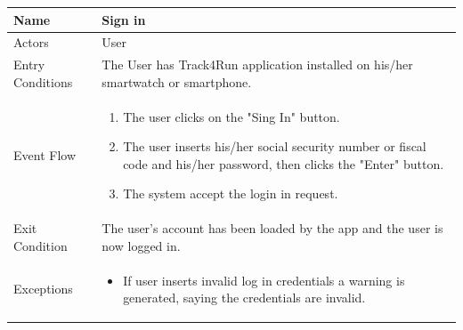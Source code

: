 \begin{enumerate}
\FloatBarrier
\begin{table}[h]
\begin{tabular}{|l|l|}
\hline
Name             & Sign in \\ \hline
Actors           & User  \\ \hline
Entry Conditions & The User has Track4Run application installed on his/her smartwatch or smartphone.    \\ \hline
Event Flow       & \parbox{.45\textwidth}{\begin{enumerate}
            \item The user clicks on the "Sing In" button.
            \item The user inserts his/her social security number or fiscal code and his/her password, then clicks the "Enter" button.
            \item The system accept the login in request.
        \end{enumerate}}\\ \hline
Exit Condition   & The user's account has been loaded by the app and the user is now logged in.\\ \hline
Exceptions       & \parbox{.45\textwidth}  
{\begin{itemize}
\item If user inserts invalid log in credentials a warning is generated, saying the credentials are invalid.
\end{itemize}}\\ \hline
\end{tabular}
\end{table}
\FloatBarrier


\end{enumerate}
